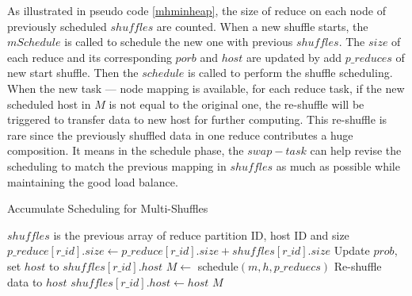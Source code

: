 As illustrated in pseudo code \ref{mhminheap}, the size of reduce on each node of previously scheduled $shuffles$ are counted. When a new shuffle starts, the $mSchedule$ is called to schedule the new one with previous $shuffles$. The $size$ of each reduce and its corresponding $porb$ and $host$ are updated by add $p\_reduces$ of new start shuffle. Then the $schedule$ is called to perform the shuffle scheduling. When the new task --- node mapping is available, for each reduce task, if the new scheduled host in $M$ is not equal to the original one, the re-shuffle will be triggered to transfer data to new host for further computing. This re-shuffle is rare since the previously shuffled data in one reduce contributes a huge composition. It means in the schedule phase, the $swap-task$ can help revise the scheduling to match the previous mapping in $shuffles$ as much as possible while maintaining the good load balance.
\begin{minipage}{\linewidth}
\begin{algorithm}[H]
\caption{Accumulate Scheduling for Multi-Shuffles}
\label{mhminheap}
	\begin{algorithmic}[1]
	\small
		\State
		\Comment $shuffles$ is the previous array of reduce partition ID, host ID and size
		\State $p\_reduce\left[r\_id\right].size\gets p\_reduce\left[r\_id\right].size + shuffles\left[r\_id\right].size$
		\State Update $prob$, set $host$ to $shuffles\left[r\_id\right].host$
		\EndIf
		\EndFor
		\State $M\gets$ schedule$\left(m, h, p\_reduecs\right)$
				\State Re-shuffle data to $host$
				\State $shuffles\left[r\_id\right].host\gets host$
				\EndIf
			\EndFor
		\EndFor
		\Return $M$
	\EndProcedure
	\end{algorithmic}
\end{algorithm}
\end{minipage} 